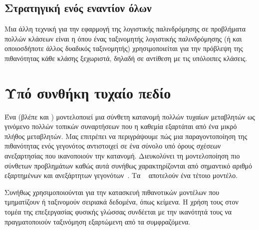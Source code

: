 \subsection{Στρατηγική ενός εναντίον όλων}
Μια άλλη τεχνική για την εφαρμογή της λογιστικής παλινδρόμησης σε προβλήματα πολλών κλάσεων είναι η
όπου ένας ταξινομητής λογιστικής παλινδρόμησης (ή και οποιοσδήποτε άλλος δυαδικός ταξινομητής)
χρησιμοποιείται για την πρόβλεψη της πιθανότητας κάθε κλάσης ξεχωριστά, δηλαδή σε αντίθεση με τις υπόλοιπες κλάσεις.

\section{Υπό συνθήκη τυχαίο πεδίο}\label{sec:crf}

Ένα  (βλέπε και )
μοντελοποιεί μια σύνθετη κατανομή πολλών τυχαίων μεταβλητών ως γινόμενο πολλών τοπικών συναρτήσεων που η καθεμία εξαρτάται από ένα μικρό πλήθος μεταβλητών.
Μας επιτρέπει να περιγράψουμε πώς μια παραγοντοποίηση της πιθανότητας ενός γεγονότος αντιστοιχεί σε ένα σύνολο υπό όρους σχέσεων ανεξαρτησίας που ικανοποιούν την κατανομή.
Διευκολύνει τη μοντελοποίηση πιο σύνθετων προβλημάτων καθώς αυτά συνήθως χαρακτηρίζονται από σημαντικό αριθμό εξαρτημένων και ανεξάρτητων γεγονότων~\cite{sutton2012introduction}.
Τα ~\cite{lafferty2001conditional} αποτελούν ένα τέτοιο μοντέλο.

Συνήθως χρησιμοποιούνται για την κατασκευή πιθανοτικών μοντέλων που τμηματίζουν ή ταξινομούν σειριακά δεδομένα, όπως κείμενα.
Η χρήση τους στον τομέα της επεξεργασίας φυσικής γλώσσας συνδέεται με την ικανότητά τους να πραγματοποιούν ταξινόμηση εξαρτώμενη από τα συμφραζόμενα.

